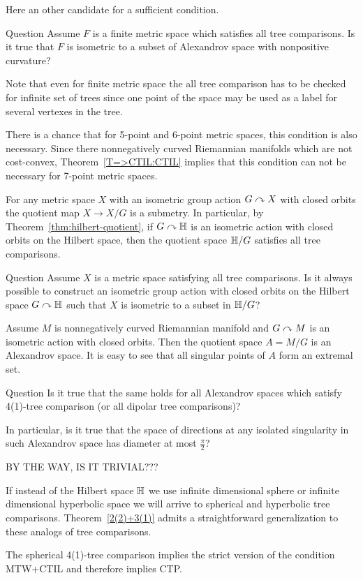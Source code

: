 Here an other candidate for a sufficient condition.

\begin{thm}{Question}
Assume $F$ is a finite metric space which satisfies all tree comparisons.
Is it true that $F$ is isometric to a subset of Alexandrov space with nonpositive curvature?
\end{thm}

Note that even for finite metric space the all tree comparison has to be checked for infinite set of trees since one point of the space may be used as a label for several vertexes in the tree.

There is a chance that for 5-point and 6-point metric spaces, this condition is also necessary. 
Since there nonnegatively curved Riemannian manifolds which are not cost-convex, 
Theorem~\ref{T=>CTIL:CTIL} implies that this condition can not be necessary for 7-point metric spaces.

For any metric space $X$ with an isometric group action $G\curvearrowright X$ with closed orbits the quotient map $X\to X/G$ is a submetry.
In particular, by Theorem~\ref{thm:hilbert-quotient}, if $G\curvearrowright \mathbb{H}$ is an isometric action with closed orbits on the Hilbert space, then the quotient space $\mathbb{H}/G$ satisfies all tree comparisons.

\begin{thm}{Question}
Assume $X$ is a metric space satisfying all tree comparisons.
Is it always possible to construct an isometric group action with closed orbits on the Hilbert space $G\curvearrowright \mathbb{H}$ such that $X$ is isometric to a subset in $\mathbb{H}/G$?
\end{thm}

Assume $M$ is nonnegatively curved Riemannian manifold
and $G\curvearrowright M$ is an isometric action with closed orbits.
Then the quotient space $A=M/G$ is an Alexandrov space.
It is easy to see that all singular points of $A$ form an extremal set.

\begin{thm}{Question}
Is it true that the same holds for all Alexandrov spaces which satisfy 4(1)-tree  comparison (or all dipolar tree comparisons)?

In particular, is it true that the space of directions at any isolated singularity in such Alexandrov space has diameter at most $\tfrac\pi2$?
\end{thm}

BY THE WAY, IS IT TRIVIAL???

If instead of the Hilbert space $\mathbb{H}$ we use infinite dimensional sphere or infinite dimensional hyperbolic space we will arrive to spherical and hyperbolic tree comparisons.
Theorem~\ref{2(2)+3(1)} admits a straightforward generalization to these analogs of tree comparisons.

The spherical 4(1)-tree comparison implies the strict version of the condition MTW+CTIL and therefore implies CTP.

